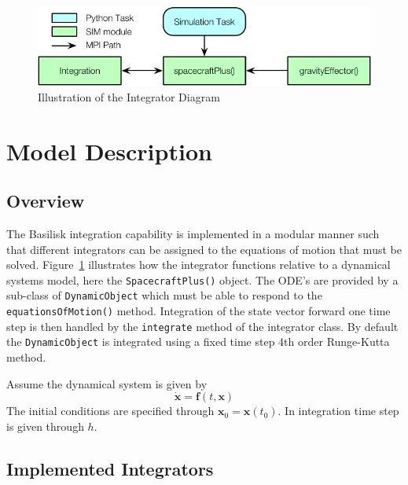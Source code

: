 

\begin{figure}[htb]
	\centerline{
	\includegraphics[]{Figures/integratorDiagram}
	}
	\caption{Illustration of the Integrator Diagram}
	\label{fig:intDiag}
\end{figure}


\section{Model Description}

\subsection{Overview}
The Basilisk integration capability is implemented in a modular manner such that different integrators can be assigned to the equations of motion that must be solved.  Figure~\ref{fig:intDiag} illustrates how the integrator functions relative to a dynamical systems model, here the {\tt SpacecraftPlus()} object.  The ODE's are provided by a sub-class of {\tt DynamicObject} which must be able to respond to the {\tt equationsOfMotion()} method.  Integration of the state vector forward one time step is then handled by the {\tt integrate} method of the integrator class.  By default the {\tt DynamicObject} is integrated using a fixed time step 4th order Runge-Kutta method.  

Assume the dynamical system is given by
\begin{equation}
	\dot{\bm x} = \bm f(t, \bm x)
\end{equation}
The initial conditions are specified through $\bm x_{0} = \bm x(t_{0})$.  In integration time step is given through $h$.  

\subsection{Implemented Integrators}

